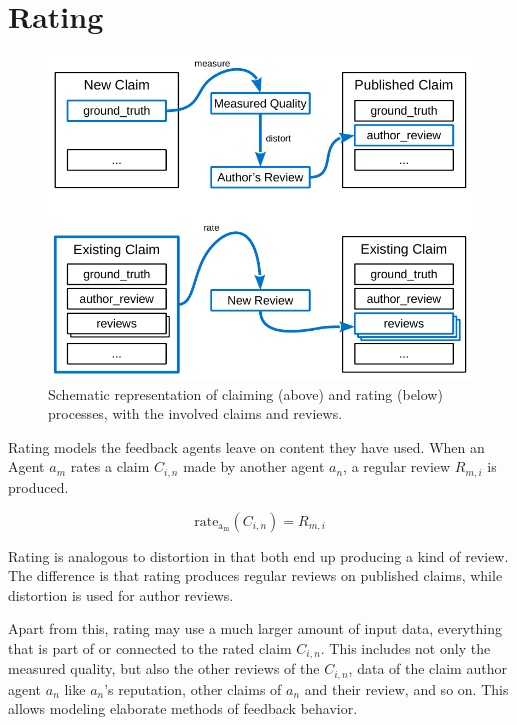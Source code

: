 \documentclass[%
    ]{\PathToTumTemplate/thesis/tum_thesis}
\begin{document}
\section{Rating}\label{sec:approach_rating_strategies}
\begin{figure}[tbp]
  \begin{center}
        \includegraphics[width=1\linewidth]	{../images/claim_rate_process-crop.pdf}
    \caption{
    Schematic representation of claiming (above) and rating (below) processes, with the involved claims and reviews.
    }
    \label{fig:claim_rate_process}
  \end{center}
\end{figure}

Rating models the feedback agents leave on content they have used.
When an Agent $a_m$ rates a claim $C_{i,n}$ made by another agent $a_n$, a regular review $R_{m,i}$ is produced.

\begin{equation}
\mathrm{rate_{a_m}}(C_{i,n}) = R_{m,i}
\end{equation}

Rating is analogous to distortion in that both end up producing a kind of review.
The difference is that rating produces regular reviews on published claims, while distortion is used for author reviews.

Apart from this, rating may use a much larger amount of input data, everything that is part of or connected to the rated claim $C_{i,n}$.
This includes not only the measured quality, but also the other reviews of the $C_{i,n}$, data of the claim author agent $a_{n}$ like $a_{n}$'s reputation, other claims of $a_{n}$ and their review, and so on.
This allows modeling elaborate methods of feedback behavior.
\end{document}
